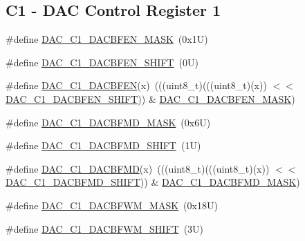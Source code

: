 \subsection*{C1 -\/ D\+AC Control Register 1}
\begin{DoxyCompactItemize}
\item 
\#define \mbox{\hyperlink{group___d_a_c___register___masks_ga61aa82d21d0c84ff4fe42d0856c506bd}{D\+A\+C\+\_\+\+C1\+\_\+\+D\+A\+C\+B\+F\+E\+N\+\_\+\+M\+A\+SK}}~(0x1\+U)
\item 
\#define \mbox{\hyperlink{group___d_a_c___register___masks_ga2062351429a9e737c0ac434488b59fe4}{D\+A\+C\+\_\+\+C1\+\_\+\+D\+A\+C\+B\+F\+E\+N\+\_\+\+S\+H\+I\+FT}}~(0\+U)
\item 
\#define \mbox{\hyperlink{group___d_a_c___register___masks_ga49da018be97202b42f8ffc39d5aaa848}{D\+A\+C\+\_\+\+C1\+\_\+\+D\+A\+C\+B\+F\+EN}}(x)~(((uint8\+\_\+t)(((uint8\+\_\+t)(x)) $<$$<$ \mbox{\hyperlink{group___d_a_c___register___masks_ga2062351429a9e737c0ac434488b59fe4}{D\+A\+C\+\_\+\+C1\+\_\+\+D\+A\+C\+B\+F\+E\+N\+\_\+\+S\+H\+I\+FT}})) \& \mbox{\hyperlink{group___d_a_c___register___masks_ga61aa82d21d0c84ff4fe42d0856c506bd}{D\+A\+C\+\_\+\+C1\+\_\+\+D\+A\+C\+B\+F\+E\+N\+\_\+\+M\+A\+SK}})
\item 
\#define \mbox{\hyperlink{group___d_a_c___register___masks_ga28373e4d9ae322da4f6a37933a340b78}{D\+A\+C\+\_\+\+C1\+\_\+\+D\+A\+C\+B\+F\+M\+D\+\_\+\+M\+A\+SK}}~(0x6\+U)
\item 
\#define \mbox{\hyperlink{group___d_a_c___register___masks_ga779629844ed0967b310e7f2721c54624}{D\+A\+C\+\_\+\+C1\+\_\+\+D\+A\+C\+B\+F\+M\+D\+\_\+\+S\+H\+I\+FT}}~(1\+U)
\item 
\#define \mbox{\hyperlink{group___d_a_c___register___masks_gabfcb0420c4e52f927d23e6c28554d648}{D\+A\+C\+\_\+\+C1\+\_\+\+D\+A\+C\+B\+F\+MD}}(x)~(((uint8\+\_\+t)(((uint8\+\_\+t)(x)) $<$$<$ \mbox{\hyperlink{group___d_a_c___register___masks_ga779629844ed0967b310e7f2721c54624}{D\+A\+C\+\_\+\+C1\+\_\+\+D\+A\+C\+B\+F\+M\+D\+\_\+\+S\+H\+I\+FT}})) \& \mbox{\hyperlink{group___d_a_c___register___masks_ga28373e4d9ae322da4f6a37933a340b78}{D\+A\+C\+\_\+\+C1\+\_\+\+D\+A\+C\+B\+F\+M\+D\+\_\+\+M\+A\+SK}})
\item 
\#define \mbox{\hyperlink{group___d_a_c___register___masks_gaad89dbfc60735cf12eb6cfff9157fffa}{D\+A\+C\+\_\+\+C1\+\_\+\+D\+A\+C\+B\+F\+W\+M\+\_\+\+M\+A\+SK}}~(0x18\+U)
\item 
\#define \mbox{\hyperlink{group___d_a_c___register___masks_gacc4542331c55b93fe589d439a69122f7}{D\+A\+C\+\_\+\+C1\+\_\+\+D\+A\+C\+B\+F\+W\+M\+\_\+\+S\+H\+I\+FT}}~(3\+U)

\end{DoxyCompactItemize}

